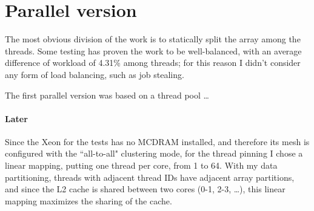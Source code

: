 \section{Parallel version}
The most obvious division of the work is to statically split the array among the threads. Some testing has proven the work to be well-balanced, with an average difference of workload of 4.31\% among threads; for this reason I didn't consider any form of load balancing, such as job stealing.
\bigbreak

The first parallel version was based on a thread pool \dots

\paragraph{Later}
Since the Xeon for the tests has no MCDRAM installed, and therefore its mesh is configured with the ``all-to-all" clustering mode, for the thread pinning I chose a linear mapping, putting one thread per core, from 1 to 64. With my data partitioning, threads with adjacent thread IDs have adjacent array partitions, and since the L2 cache is shared between two cores (0-1, 2-3, \dots), this linear mapping maximizes the sharing of the cache.

